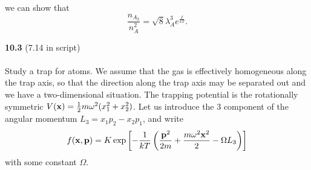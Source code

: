 \documentclass[11pt,letterpaper]{article}
\begin{document}
		we can show that
		\[
			\frac{n_{A_2}}{n^2_{A}} = \sqrt 8 \lambda_A^3 e^{\frac{I}{kT}}.
		\]
	\eenum 
	\item[\textbf{10.3}]
	(7.14 in script)
	\\ \\
	Study a trap for atoms. We assume that the gas is effectively homogeneous along the trap axis,
	so that the direction along the trap axis may be separated out and we have a two-dimensional 
	situation. The trapping potential is the rotationally symmetric
	 $V(\mathbf{x}) = \frac{1}{2}m\omega^2(x_1^2+x_2^2)$. Let us introduce the 3 component of the
	 angular momentum $L_3 = x_1p_2-x_2p_1$, and write
	 \[
	 	f(\mathbf{x},\mathbf{p}) = K\exp\left[-\frac{1}{kT}\left(\frac{\mathbf{p}^2}{2m}+
		\frac{m\omega^2\mathbf{x}^2}{2}-\Omega L_3\right)\right]
	\]
	with some constant $\Omega$.
	
\end{document}
